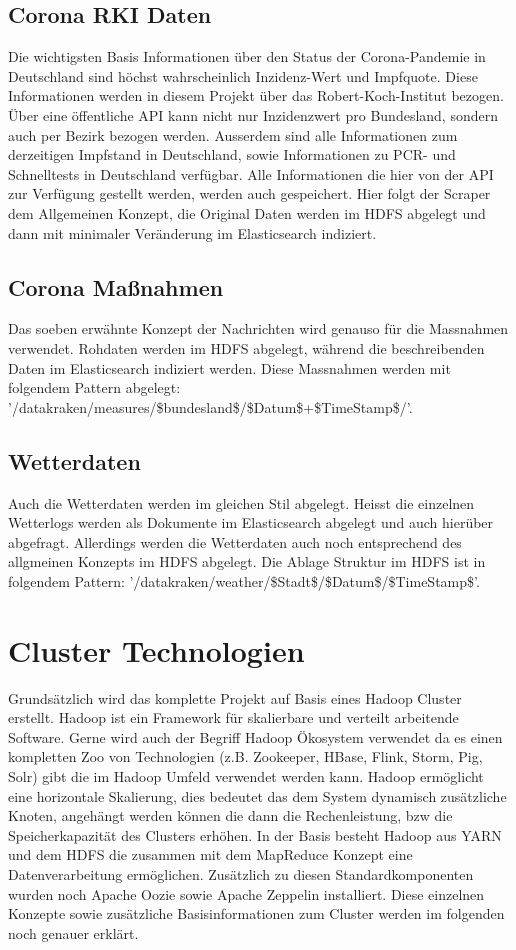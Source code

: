 \documentclass[12pt,oneside,a4paper,parskip]{scrbook}
\begin{document}
\section{Corona RKI Daten}
Die wichtigsten Basis Informationen \"uber den Status der Corona-Pandemie in Deutschland sind h\"ochst wahrscheinlich Inzidenz-Wert und Impfquote. Diese Informationen werden in diesem Projekt \"uber das Robert-Koch-Institut bezogen. \"Uber eine \"offentliche API kann nicht nur Inzidenzwert pro Bundesland, sondern auch per Bezirk bezogen werden. Ausserdem sind alle Informationen zum derzeitigen Impfstand in Deutschland, sowie Informationen zu PCR- und Schnelltests in Deutschland verf\"ugbar. Alle Informationen die hier von der API zur Verf\"ugung gestellt werden, werden auch gespeichert. Hier folgt der Scraper dem Allgemeinen Konzept, die Original Daten werden im HDFS abgelegt und dann mit minimaler Ver\"anderung im Elasticsearch indiziert.

\section{Corona Maßnahmen}
Das soeben erw\"ahnte Konzept der Nachrichten wird genauso f\"ur die Massnahmen verwendet. Rohdaten werden im HDFS abgelegt, w\"ahrend die beschreibenden Daten im Elasticsearch indiziert werden. Diese Massnahmen werden mit folgendem Pattern abgelegt: '/datakraken/measures/\$bundesland\$/\$Datum\$+\$TimeStamp\$/'.

\section{Wetterdaten}
Auch die Wetterdaten werden im gleichen Stil abgelegt. Heisst die einzelnen Wetterlogs werden als Dokumente im Elasticsearch abgelegt und auch hier\"uber abgefragt. Allerdings werden die Wetterdaten auch noch entsprechend des allgmeinen Konzepts im HDFS abgelegt. Die Ablage Struktur im HDFS ist in folgendem Pattern:  '/datakraken/weather/\$Stadt\$/\$Datum\$/\$TimeStamp\$'.
\chapter{Cluster Technologien}
Grunds\"atzlich wird das komplette Projekt auf Basis eines Hadoop Cluster erstellt. Hadoop ist ein Framework f\"ur skalierbare und verteilt arbeitende Software. Gerne wird auch der Begriff  Hadoop \"Okosystem verwendet da es einen kompletten Zoo von Technologien (z.B. Zookeeper, HBase, Flink, Storm, Pig, Solr) gibt die im Hadoop Umfeld verwendet werden kann. Hadoop erm\"oglicht eine horizontale Skalierung, dies bedeutet das dem System dynamisch zus\"atzliche Knoten, angeh\"angt werden k\"onnen die dann die Rechenleistung, bzw die Speicherkapazit\"at des Clusters erh\"ohen. In der Basis besteht Hadoop aus YARN und dem HDFS die zusammen mit dem MapReduce Konzept eine Datenverarbeitung erm\"oglichen. Zus\"atzlich zu diesen Standardkomponenten wurden noch Apache Oozie sowie Apache Zeppelin installiert. Diese einzelnen Konzepte sowie zus\"atzliche Basisinformationen zum Cluster werden im folgenden noch genauer erkl\"art.
\end{document}
